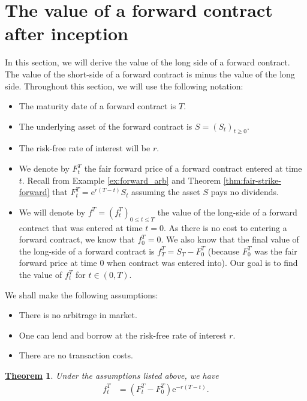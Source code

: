 \documentclass[12pt]{book}
\numberwithin{equation}{chapter}
\theoremstyle{plain}
\newtheorem{theorem}{\underline{Theorem}}
\numberwithin{theorem}{section}
\theoremstyle{definition}
\numberwithin{exercise}{chapter}
\newcommand{\<}{\langle}
\renewcommand{\>}{\rangle}
\renewcommand{\(}{\left(}
\renewcommand{\)}{\right)}
\renewcommand{\[}{\left[}
\renewcommand{\]}{\right]}
\newcommand\ee{\mathrm{e}}
\theoremstyle{definition}
\numberwithin{question}{section}
\begin{document}
\section{The value of a forward contract after inception}
In this section, we will derive the value of the long side of a forward contract.  The value of the short-side of a forward contract is minus the value of the long side.  Throughout this section, we will use the following notation:
\begin{itemize}
	\item The maturity date of a forward contract is $T$.
	\item The underlying asset of the forward contract is $S = (S_t)_{t \geq 0}$.
	\item The risk-free rate of interest will be $r$.
	\item We denote by $F_t^T$ the fair forward price of a forward contract entered at time $t$.  Recall from Example \ref{ex:forward_arb} and Theorem \ref{thm:fair-strike-forward} that $F_t^T = \ee^{r(T-t)} S_t$ assuming the asset $S$ pays no dividends.
	\item We will denote by $f^T = (f_t^T)_{0 \leq t \leq T}$ the value of the long-side of a forward contract that was entered at time $t=0$.  As there is no cost to entering a forward contract, we know that $f_0^T = 0$.  We also know that the final value of the long-side of a forward contract is $f_T^T = S_T - F_0^T$ (because  $F_0^T$ was the fair forward price at time 0 when contract was entered into).  Our goal is to find the value of $f_t^T$ for $t \in (0,T)$.
\end{itemize}
We shall make the following assumptions:
\begin{itemize}
	\item There is no arbitrage in market.
	\item One can lend and borrow at the risk-free rate of interest $r$.
	\item There are no transaction costs.
\end{itemize}

\begin{theorem} 
\label{thm:fairforward}
Under the assumptions listed above, we have
\begin{align}
f_t^T 
	&= \( F_t^T - F_0^T \) \ee^{-r(T-t)}.
\end{align}
\end{theorem}
\end{document}
